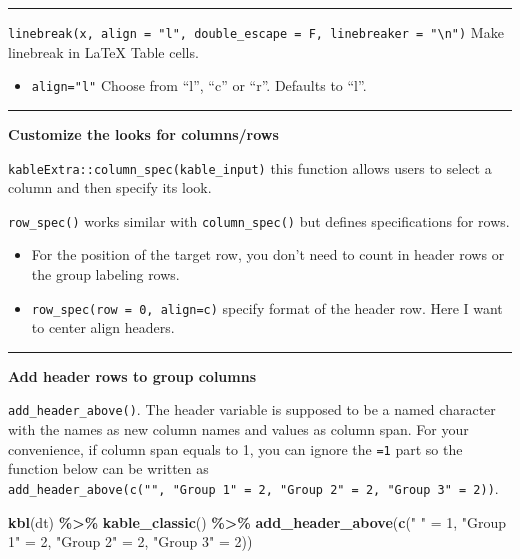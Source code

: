 \documentclass[
  a4paper,
  twoside,
  openright]{book}
\newenvironment{Shaded}{\begin{snugshade}}{\end{snugshade}}
\newcommand{\DecValTok}[1]{\textcolor[rgb]{0.00,0.00,0.81}{#1}}
\newcommand{\FunctionTok}[1]{\textcolor[rgb]{0.13,0.29,0.53}{\textbf{#1}}}
\newcommand{\NormalTok}[1]{#1}
\newcommand{\OtherTok}[1]{\textcolor[rgb]{0.56,0.35,0.01}{#1}}
\newcommand{\SpecialCharTok}[1]{\textcolor[rgb]{0.81,0.36,0.00}{\textbf{#1}}}
\newcommand{\StringTok}[1]{\textcolor[rgb]{0.31,0.60,0.02}{#1}}
\providecommand{\tightlist}{%
  \setlength{\itemsep}{0pt}\setlength{\parskip}{0pt}}
\theoremstyle{definition}
\theoremstyle{definition}
\theoremstyle{definition}
\theoremstyle{definition}
\theoremstyle{remark}
\begin{document}
\begin{center}\rule{0.5\linewidth}{0.5pt}\end{center}

\texttt{linebreak(x,\ align\ =\ "l",\ double\_escape\ =\ F,\ linebreaker\ =\ "\textbackslash{}n")} Make linebreak in LaTeX Table cells.

\begin{itemize}
\tightlist
\item
  \texttt{align="l"} Choose from ``l'', ``c'' or ``r''. Defaults to ``l''.
\end{itemize}

\begin{center}\rule{0.5\linewidth}{0.5pt}\end{center}

\textbf{Customize the looks for columns/rows}

\texttt{kableExtra::column\_spec(kable\_input)} this function allows users to select a column and then specify its look.

\texttt{row\_spec()} works similar with \texttt{column\_spec()} but defines specifications for rows.

\begin{itemize}
\tightlist
\item
  For the position of the target row, you don't need to count in header rows or the group labeling rows.
\item
  \texttt{row\_spec(row\ =\ 0,\ align=\textquotesingle{}c\textquotesingle{})} specify format of the header row. Here I want to center align headers.
\end{itemize}

\begin{center}\rule{0.5\linewidth}{0.5pt}\end{center}

\textbf{Add header rows to group columns}

\texttt{add\_header\_above()}. The header variable is supposed to be a named character with the names as new column names and values as column span. For your convenience, if column span equals to 1, you can ignore the \texttt{=1} part so the function below can be written as \texttt{add\_header\_above(c("",\ "Group\ 1"\ =\ 2,\ "Group\ 2"\ =\ 2,\ "Group\ 3"\ =\ 2))}.

\begin{Shaded}
\begin{Highlighting}[]
\FunctionTok{kbl}\NormalTok{(dt) }\SpecialCharTok{\%\textgreater{}\%}
  \FunctionTok{kable\_classic}\NormalTok{() }\SpecialCharTok{\%\textgreater{}\%}
  \FunctionTok{add\_header\_above}\NormalTok{(}\FunctionTok{c}\NormalTok{(}\StringTok{" "} \OtherTok{=} \DecValTok{1}\NormalTok{, }\StringTok{"Group 1"} \OtherTok{=} \DecValTok{2}\NormalTok{, }\StringTok{"Group 2"} \OtherTok{=} \DecValTok{2}\NormalTok{, }\StringTok{"Group 3"} \OtherTok{=} \DecValTok{2}\NormalTok{))}
\end{Highlighting}
\end{Shaded}
\end{document}
